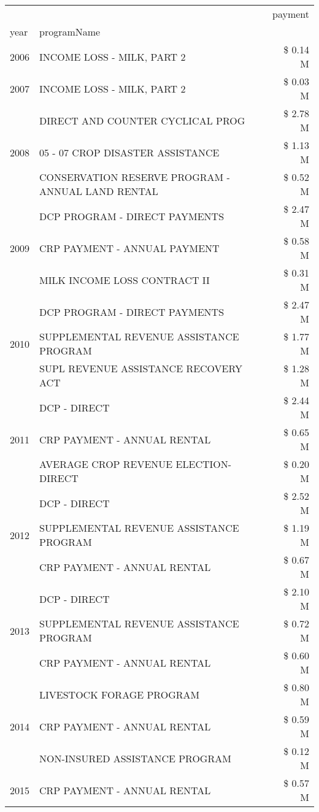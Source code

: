 \begin{tabular}{llr}
\toprule
 &  & payment \\
year & programName &  \\
\midrule
2006 & INCOME LOSS - MILK, PART 2 & \$ 0.14 M \\
\cline{1-3}
2007 & INCOME LOSS - MILK, PART 2 & \$ 0.03 M \\
\cline{1-3}
\multirow[t]{3}{*}{2008} & DIRECT AND COUNTER CYCLICAL PROG & \$ 2.78 M \\
 & 05 - 07 CROP DISASTER ASSISTANCE & \$ 1.13 M \\
 & CONSERVATION RESERVE PROGRAM - ANNUAL LAND RENTAL & \$ 0.52 M \\
\cline{1-3}
\multirow[t]{3}{*}{2009} & DCP PROGRAM - DIRECT PAYMENTS & \$ 2.47 M \\
 & CRP PAYMENT - ANNUAL PAYMENT & \$ 0.58 M \\
 & MILK INCOME LOSS CONTRACT II & \$ 0.31 M \\
\cline{1-3}
\multirow[t]{3}{*}{2010} & DCP PROGRAM - DIRECT PAYMENTS & \$ 2.47 M \\
 & SUPPLEMENTAL REVENUE ASSISTANCE PROGRAM & \$ 1.77 M \\
 & SUPL REVENUE ASSISTANCE RECOVERY ACT & \$ 1.28 M \\
\cline{1-3}
\multirow[t]{3}{*}{2011} & DCP - DIRECT & \$ 2.44 M \\
 & CRP PAYMENT - ANNUAL RENTAL & \$ 0.65 M \\
 & AVERAGE CROP REVENUE ELECTION-DIRECT & \$ 0.20 M \\
\cline{1-3}
\multirow[t]{3}{*}{2012} & DCP - DIRECT & \$ 2.52 M \\
 & SUPPLEMENTAL REVENUE ASSISTANCE PROGRAM & \$ 1.19 M \\
 & CRP PAYMENT - ANNUAL RENTAL & \$ 0.67 M \\
\cline{1-3}
\multirow[t]{3}{*}{2013} & DCP - DIRECT & \$ 2.10 M \\
 & SUPPLEMENTAL REVENUE ASSISTANCE PROGRAM & \$ 0.72 M \\
 & CRP PAYMENT - ANNUAL RENTAL & \$ 0.60 M \\
\cline{1-3}
\multirow[t]{3}{*}{2014} & LIVESTOCK FORAGE PROGRAM & \$ 0.80 M \\
 & CRP PAYMENT - ANNUAL RENTAL & \$ 0.59 M \\
 & NON-INSURED ASSISTANCE PROGRAM & \$ 0.12 M \\
\cline{1-3}
\multirow[t]{3}{*}{2015} & CRP PAYMENT - ANNUAL RENTAL & \$ 0.57 M \\

\end{tabular}
